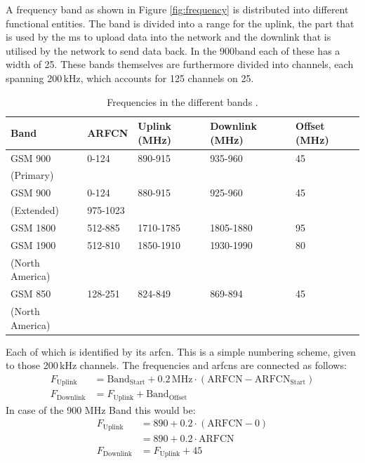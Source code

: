 A frequency band as shown in Figure \ref{fig:frequency} is distributed into different functional entities.
The band is divided into a range for the uplink, the part that is used by the \gls{ms} to upload data into the network and the downlink that is utilised by the network to send data back.
In the 900\MHz band each of these has a width of 25\MHz.
These bands themselves are furthermore divided into channels, each spanning 200\,kHz, which accounts for 125 channels on 25\MHz.

\begin{table}
\centering
\begin{tabular}{lllll}
\toprule
Band		&ARFCN		&Uplink (MHz)	&Downlink (MHz)	&Offset (MHz)\\
\midrule
GSM 900		&0-124		&890-915		&935-960		&45\\
(Primary)	&			&				&				&\\
GSM 900		&0-124		&880-915		&925-960		&45\\
(Extended)	&975-1023	&				&				&\\
GSM 1800	&512-885	&1710-1785		&1805-1880		&95\\
GSM 1900	&512-810	&1850-1910		&1930-1990		&80\\
(North America)	&			&				&				&\\
GSM 850		&128-251	&824-849		&869-894		&45\\
(North America)	&			&				&				&\\
\bottomrule
\end{tabular}
\caption{Frequencies in the different bands \cite{kommsys2006}.}
\label{tab:frequencies}
\end{table}

Each of which is identified by its \gls{arfcn}.
This is a simple numbering scheme, given to those 200\,kHz channels.
The frequencies and \glspl{arfcn} are connected as follows:
\begin{align}
F_\text{Uplink} 	&= \text{Band}_\text{Start} + 0.2\,\text{MHz} \cdot (\text{ARFCN} -\text{ARFCN}_\text{Start})\\
F_\text{Downlink}   &= F_\text{Uplink} + \text{Band}_\text{Offset}
\end{align}
In case of the 900 MHz Band this would be:
\begin{align}
F_\text{Uplink}		&=890 + 0.2 \cdot (\text{ARFCN} - 0)\\
					&=890 + 0.2 \cdot \text{ARFCN}\\
F_\text{Downlink}	&=F_\text{Uplink} + 45
\end{align}

